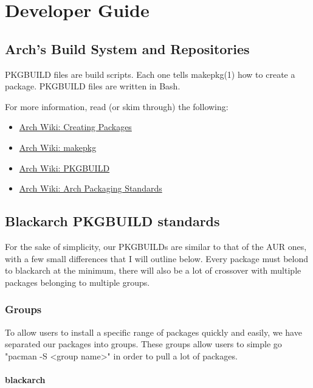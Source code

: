 \documentclass[a4paper, oneside, 11pt]{book}
\begin{document}

\chapter{Developer Guide}

\section{Arch's Build System and Repositories}

PKGBUILD files are build scripts. Each one tells makepkg(1) how to create a package. PKGBUILD files
are written in Bash.

For more information, read (or skim through) the following:
\begin{itemize}
	\item \href{https://wiki.archlinux.org/index.php/Creating_Packages}{Arch Wiki: Creating Packages}
	\item \href{https://wiki.archlinux.org/index.php/Makepkg}{Arch Wiki: makepkg}
	\item \href{https://wiki.archlinux.org/index.php/PKGBUILD}{Arch Wiki: PKGBUILD}
	\item \href{https://wiki.archlinux.org/index.php/Arch_Packaging_Standards}{Arch Wiki: Arch Packaging Standards}
\end{itemize}

\section{Blackarch PKGBUILD standards}

For the sake of simplicity, our PKGBUILDs are similar to that of the AUR ones, with a few small differences that I will outline below. Every package must belond to blackarch at the minimum, there will also be a lot of crossover with multiple packages belonging to multiple groups.

\subsection{Groups}

To allow users to install a specific range of packages quickly and easily, we have separated our packages into groups. These groups allow users to simple go "pacman -S <group name>" in order to pull a lot of packages.

\subsubsection{blackarch}
\end{document}
